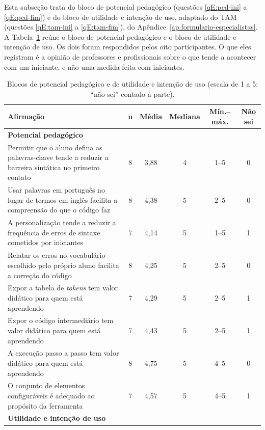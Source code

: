 Esta subseção trata do bloco de potencial pedagógico (questões \ref{qE:ped-ini} a \ref{qE:ped-fim}) e do bloco de utilidade e intenção de uso, adaptado do TAM (questões \ref{qE:tam-ini} a \ref{qE:tam-fim}), do Apêndice~\ref{ap:formulario-especialistas}. A Tabela~\ref{tab:resultado-pedagogico} reúne o bloco de potencial pedagógico e o bloco de utilidade e intenção de uso. Os dois foram respondidos pelos oito participantes. O que eles registram é a opinião de professores e profissionais sobre o que tende a acontecer com um iniciante, e não uma medida feita com iniciantes.

\begin{table}[htbp]
\centering
\caption{Blocos de potencial pedagógico e de utilidade e intenção de uso (escala de 1 a 5; ``não sei'' contado à parte).}
\label{tab:resultado-pedagogico}
\footnotesize
\renewcommand{\arraystretch}{1.2}
\begin{tabular}{|p{8.0cm}|c|c|c|c|c|}
\hline
\textbf{Afirmação} & \textbf{n} & \textbf{Média} & \textbf{Mediana} & \textbf{Mín.--máx.} & \textbf{Não sei} \\\hline
\multicolumn{6}{|l|}{\textbf{Potencial pedagógico}} \\\hline
Permitir que o aluno defina as palavras-chave tende a reduzir a barreira sintática no primeiro contato & 8 & 3,88 & 4 & 1--5 & 0 \\\hline
Usar palavras em português no lugar de termos em inglês facilita a compreensão do que o código faz & 8 & 4,38 & 5 & 2--5 & 0 \\\hline
A personalização tende a reduzir a frequência de erros de sintaxe cometidos por iniciantes & 7 & 4,14 & 5 & 1--5 & 1 \\\hline
Relatar os erros no vocabulário escolhido pelo próprio aluno facilita a correção do código & 8 & 4,25 & 5 & 2--5 & 0 \\\hline
Expor a tabela de \textit{tokens} tem valor didático para quem está aprendendo & 7 & 4,29 & 5 & 2--5 & 1 \\\hline
Expor o código intermediário tem valor didático para quem está aprendendo & 7 & 4,43 & 5 & 2--5 & 1 \\\hline
A execução passo a passo tem valor didático para quem está aprendendo & 8 & 4,75 & 5 & 4--5 & 0 \\\hline
O conjunto de elementos configuráveis é adequado ao propósito da ferramenta & 7 & 4,57 & 5 & 4--5 & 1 \\\hline
\multicolumn{6}{|l|}{\textbf{Utilidade e intenção de uso}} \\\hline

\end{tabular}
\end{table}
